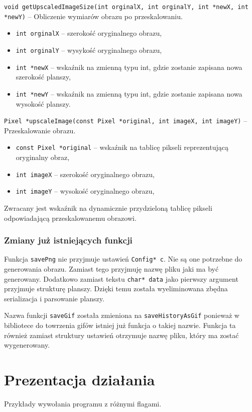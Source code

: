 \documentclass{mwart}
\begin{document}
\noindent{}\texttt{void getUpscaledImageSize(int orginalX, int orginalY, int *newX, int *newY)} -- Obliczenie wymiarów obrazu po przeskalowaniu.
\begin{itemize}[label={}]
	\item\texttt{int orginalX} -- szerokość oryginalnego obrazu,
	\item\texttt{int orginalY} -- wysykość oryginalnego obrazu,
	\item \texttt{int *newX} -- wskaźnik na zmienną typu int, gdzie zostanie zapisana nowa szerokość planszy,
	\item \texttt{int *newY} -- wskaźnik na zmienną typu int, gdzie zostanie zapisana nowa wysokość planszy.
\end{itemize}

\noindent{}\texttt{Pixel *upscaleImage(const Pixel *original, int imageX, int imageY)} -- Przeskalowanie obrazu.
\begin{itemize}[label={}]
	\item\texttt{const Pixel *original} -- wskaźnik na tablicę pikseli reprezentującą oryginalny obraz,
	\item\texttt{int imageX} -- szerokość oryginalnego obrazu,
	\item \texttt{int imageY} -- wysokość oryginalnego obrazu,
\end{itemize}
Zwracany jest wskaźnik na dynamicznie przydzieloną tablicę pikseli odpowiadającą przeskalowanemu obrazowi.

\subsubsection{Zmiany już istniejących funkcji}
Funkcja \texttt{savePng} nie przyjmuje ustawień \texttt{Config* c}. Nie są one potrzebne do generowania obrazu. Zamiast tego przyjmuję nazwę pliku jaki ma być generowany. Dodatkowo zamiast tekstu \texttt{char* data} jako pierwszy argument przyjmuje strukturę planszy. Dzięki temu została wyeliminowana zbędna serializacja i parsowanie planszy.

Nazwa funkcji \texttt{saveGif} została zmieniona na \texttt{saveHistoryAsGif} ponieważ w bibliotece do towrzenia gifów istniej już funkcja o takiej nazwie. Funkcja ta również zamiast struktury ustawień otrzymuje nazwę pliku, który ma zostać wygenerowany.

\section{Prezentacja działania}
Przykłady wywołania programu z różnymi flagami.
\end{document}

